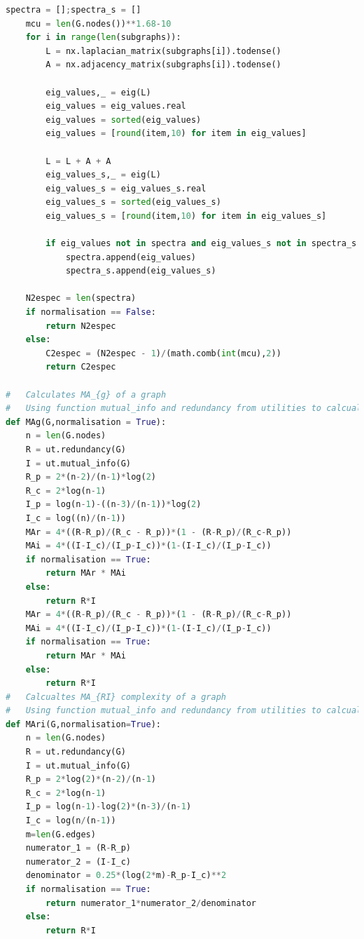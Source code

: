 \documentclass[12pt]{article}
\begin{document}
{\begin{lstlisting}[language=Python,breaklines=true]
    spectra = [];spectra_s = []
    mcu = len(G.nodes())**1.68-10
    for i in range(len(subgraphs)):
        L = nx.laplacian_matrix(subgraphs[i]).todense()
        A = nx.adjacency_matrix(subgraphs[i]).todense()
        
        eig_values,_ = eig(L)
        eig_values = eig_values.real
        eig_values = sorted(eig_values)
        eig_values = [round(item,10) for item in eig_values]
        
        L = L + A + A
        eig_values_s,_ = eig(L)
        eig_values_s = eig_values_s.real
        eig_values_s = sorted(eig_values_s)
        eig_values_s = [round(item,10) for item in eig_values_s]
        
        if eig_values not in spectra and eig_values_s not in spectra_s:
            spectra.append(eig_values)
            spectra_s.append(eig_values_s)
            
    N2espec = len(spectra)
    if normalisation == False:
        return N2espec
    else:
        C2espec = (N2espec - 1)/(math.comb(int(mcu),2))
        return C2espec

#   Calculates MA_{g} of a graph
#   Using function mutual_info and redundancy from utilities to calcualte I and R
def MAg(G,normalisation = True):
    n = len(G.nodes)
    R = ut.redundancy(G)
    I = ut.mutual_info(G)
    R_p = 2*(n-2)/(n-1)*log(2)
    R_c = 2*log(n-1)
    I_p = log(n-1)-((n-3)/(n-1))*log(2)
    I_c = log((n)/(n-1))
    MAr = 4*((R-R_p)/(R_c - R_p))*(1 - (R-R_p)/(R_c-R_p))
    MAi = 4*((I-I_c)/(I_p-I_c))*(1-(I-I_c)/(I_p-I_c))
    if normalisation == True:
        return MAr * MAi
    else:
        return R*I
    MAr = 4*((R-R_p)/(R_c - R_p))*(1 - (R-R_p)/(R_c-R_p))
    MAi = 4*((I-I_c)/(I_p-I_c))*(1-(I-I_c)/(I_p-I_c))
    if normalisation == True:
        return MAr * MAi
    else:
        return R*I
#   Calcualtes MA_{RI} complexity of a graph
#   Using function mutual_info and redundancy from utilities to calcualte I and R
def MAri(G,normalisation=True):
    n = len(G.nodes)
    R = ut.redundancy(G)
    I = ut.mutual_info(G)
    R_p = 2*log(2)*(n-2)/(n-1)
    R_c = 2*log(n-1)
    I_p = log(n-1)-log(2)*(n-3)/(n-1)
    I_c = log(n/(n-1))
    m=len(G.edges)
    numerator_1 = (R-R_p)
    numerator_2 = (I-I_c)
    denominator = 0.25*(log(2*m)-R_p-I_c)**2
    if normalisation == True:
        return numerator_1*numerator_2/denominator
    else:
        return R*I
\end{lstlisting}

}
\end{document}
